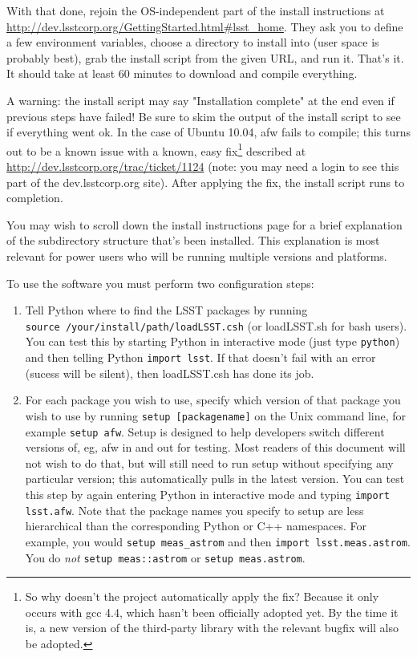 \documentclass{book}
\def\t{\texttt}
\begin{document}
With that done, rejoin the OS-independent part of the install
instructions at
\url{http://dev.lsstcorp.org/GettingStarted.html#lsst_home}.  They ask
you to define a few environment variables, choose a directory to
install into (user space is probably best), grab the install script
from the given URL, and run it.  That's it.  It should take at least
60 minutes to download and compile everything. 

A warning: the install script may say "Installation complete" at the
end even if previous steps have failed!  Be sure to skim the output of
the install script to see if everything went ok.  In the case of
Ubuntu 10.04, afw fails to compile; this turns out to be a known issue
with a known, easy fix\footnote{So why doesn't the project
  automatically apply the fix?  Because it only occurs with gcc 4.4,
  which hasn't been officially adopted yet. By the time it is, a new
  version of the third-party library with the relevant bugfix will
  also be adopted.} described at
\url{http://dev.lsstcorp.org/trac/ticket/1124} (note: you may need a
login to see this part of the dev.lsstcorp.org site).  After applying
the fix, the install script runs to completion.

You may wish to scroll down the install instructions page for a brief
explanation of the subdirectory structure that's been installed.  This
explanation is most relevant for power users who will be running
multiple versions and platforms.

To use the software you must perform two configuration steps:
\begin{enumerate}
\item Tell Python where to find the LSST packages by
  running \\ \texttt{source /your/install/path/loadLSST.csh} (or loadLSST.sh
  for bash users).  You can test this by starting Python in
  interactive mode (just type \texttt{python}) and then telling Python
  \texttt{import lsst}.  If that doesn't fail with an error (sucess
  will be silent), then loadLSST.csh has done its job.

\item For each package you wish to use, specify which version of that
  package you wish to use by running \texttt{setup [packagename]} on the
  Unix command line, for example \texttt{setup afw}.  Setup is designed to
  help developers switch different versions of, eg, afw in and out for
  testing.  Most readers of this document will not wish to do that,
  but will still need to run setup without specifying any particular
  version; this automatically pulls in the latest version.  You can
  test this step by again entering Python in interactive mode and
  typing \texttt{import lsst.afw}.  Note that the package names you specify
  to setup are less hierarchical than the corresponding Python or C++
  namespaces.  For example, you would \t{setup meas\_astrom} and then
  \t{import lsst.meas.astrom}.  You do {\it not} \t{setup meas::astrom} or 
  \t{setup meas.astrom}.

\end{enumerate}
\end{document}
